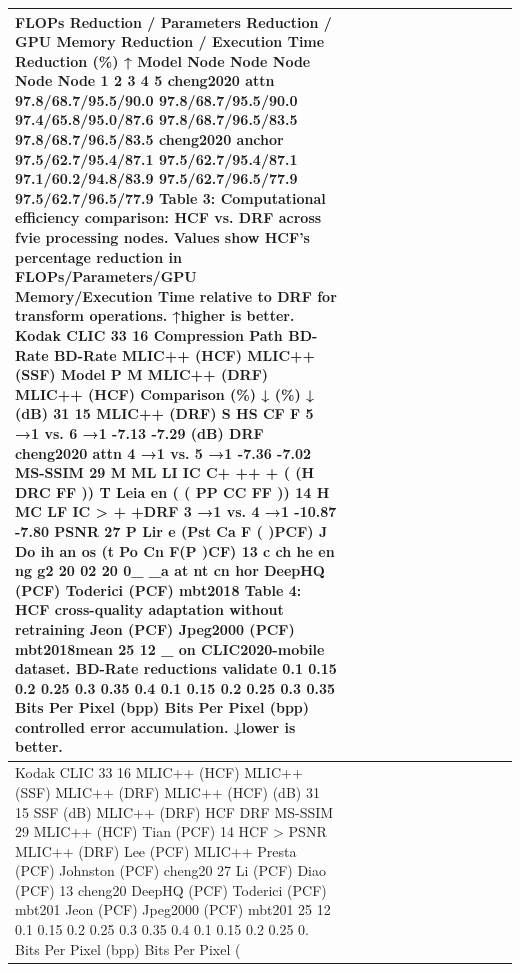 \begin{tabular}{lllllllllllll}
\toprule
FLOPs Reduction / Parameters Reduction / GPU Memory Reduction / Execution Time Reduction (\%) ↑ Model Node Node Node Node Node 1 2 3 4 5 cheng2020 attn 97.8/68.7/95.5/90.0 97.8/68.7/95.5/90.0 97.4/65.8/95.0/87.6 97.8/68.7/96.5/83.5 97.8/68.7/96.5/83.5 cheng2020 anchor 97.5/62.7/95.4/87.1 97.5/62.7/95.4/87.1 97.1/60.2/94.8/83.9 97.5/62.7/96.5/77.9 97.5/62.7/96.5/77.9 Table 3: Computational efficiency comparison: HCF vs. DRF across fvie processing nodes. Values show HCF’s percentage reduction in FLOPs/Parameters/GPU Memory/Execution Time relative to DRF for transform operations. ↑higher is better. Kodak CLIC 33 16 Compression Path BD-Rate BD-Rate MLIC++ (HCF) MLIC++ (SSF) Model P M MLIC++ (DRF) MLIC++ (HCF) Comparison (\%) ↓ (\%) ↓ (dB) 31 15 MLIC++ (DRF) S HS CF F 5 →1 vs. 6 →1 -7.13 -7.29 (dB) DRF cheng2020 attn 4 →1 vs. 5 →1 -7.36 -7.02 MS-SSIM 29 M ML LI IC C+ ++ + ( (H DRC FF )) T Leia en ( ( PP CC FF )) 14 H MC LF IC > + +DRF 3 →1 vs. 4 →1 -10.87 -7.80 PSNR 27 P Lir e (Pst Ca F ( )PCF) J Do ih an os (t Po Cn F(P )CF) 13 c ch he en ng g2 20 02 20 0\_ \_a at nt cn hor DeepHQ (PCF) Toderici (PCF) mbt2018 Table 4: HCF cross-quality adaptation without retraining Jeon (PCF) Jpeg2000 (PCF) mbt2018mean 25 12 \_ on CLIC2020-mobile dataset. BD-Rate reductions validate 0.1 0.15 0.2 0.25 0.3 0.35 0.4 0.1 0.15 0.2 0.25 0.3 0.35 Bits Per Pixel (bpp) Bits Per Pixel (bpp) controlled error accumulation. ↓lower is better. &  &  &  &  &  &  &  &  &  &  &  &  \\
\midrule
Kodak CLIC 33 16 MLIC++ (HCF) MLIC++ (SSF) MLIC++ (DRF) MLIC++ (HCF) (dB) 31 15 SSF (dB) MLIC++ (DRF) HCF DRF MS-SSIM 29 MLIC++ (HCF) Tian (PCF) 14 HCF > PSNR MLIC++ (DRF) Lee (PCF) MLIC++ Presta (PCF) Johnston (PCF) cheng20 27 Li (PCF) Diao (PCF) 13 cheng20 DeepHQ (PCF) Toderici (PCF) mbt201 Jeon (PCF) Jpeg2000 (PCF) mbt201 25 12 0.1 0.15 0.2 0.25 0.3 0.35 0.4 0.1 0.15 0.2 0.25 0. Bits Per Pixel (bpp) Bits Per Pixel ( &  &  &  &  &  &  &  &  &  &  &  &  \\

\end{tabular}
